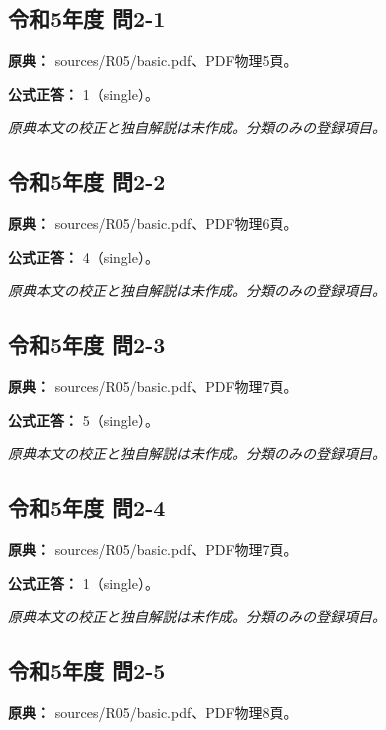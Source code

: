 \subsection{令和5年度 問2-1}
\label{q:r05-reg-basic-2-1}

\noindent\textbf{原典：} sources/R05/basic.pdf、PDF物理5頁。

\textbf{公式正答：} 1（single）。

\par\textit{原典本文の校正と独自解説は未作成。分類のみの登録項目。}

\subsection{令和5年度 問2-2}
\label{q:r05-reg-basic-2-2}

\noindent\textbf{原典：} sources/R05/basic.pdf、PDF物理6頁。

\textbf{公式正答：} 4（single）。

\par\textit{原典本文の校正と独自解説は未作成。分類のみの登録項目。}

\subsection{令和5年度 問2-3}
\label{q:r05-reg-basic-2-3}

\noindent\textbf{原典：} sources/R05/basic.pdf、PDF物理7頁。

\textbf{公式正答：} 5（single）。

\par\textit{原典本文の校正と独自解説は未作成。分類のみの登録項目。}

\subsection{令和5年度 問2-4}
\label{q:r05-reg-basic-2-4}

\noindent\textbf{原典：} sources/R05/basic.pdf、PDF物理7頁。

\textbf{公式正答：} 1（single）。

\par\textit{原典本文の校正と独自解説は未作成。分類のみの登録項目。}

\subsection{令和5年度 問2-5}
\label{q:r05-reg-basic-2-5}

\noindent\textbf{原典：} sources/R05/basic.pdf、PDF物理8頁。

